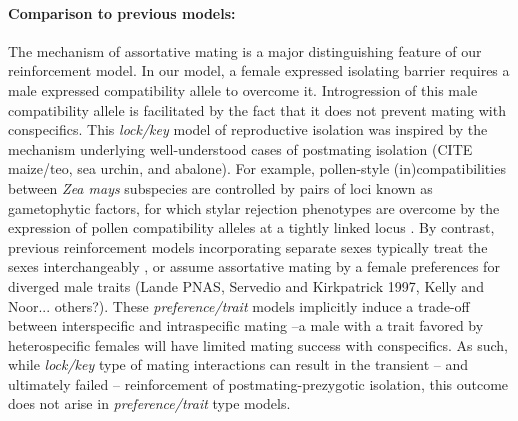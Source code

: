 \documentclass[11pt]{article}
\begin{document}
\paragraph{Comparison to previous models:}  
The mechanism of assortative mating is a major distinguishing feature of our reinforcement model. 
In our model, a female expressed isolating barrier requires a male expressed compatibility allele to overcome it.   %
Introgression of this male compatibility allele is facilitated by the fact that it does not prevent mating with conspecifics. 
This \textit{lock/key} model of reproductive isolation was inspired by the mechanism underlying well-understood cases of postmating isolation (CITE maize/teo, sea urchin, and abalone). 
For example, pollen-style (in)compatibilities between \textit{Zea mays} subspecies are controlled by pairs of loci known as gametophytic factors, for which stylar rejection phenotypes are overcome by the expression of pollen compatibility alleles at a tightly linked locus \cite{NELSON,1993}. 
By contrast, previous reinforcement models incorporating separate sexes typically treat the sexes interchangeably \citep[e.g. ][]{Felsenstein}, or assume assortative mating by a female preferences for diverged male traits (Lande PNAS, Servedio and Kirkpatrick 1997, Kelly and Noor... others?). 
These \textit{preference/trait} models implicitly induce a trade-off between interspecific and intraspecific mating --a male with a trait favored by heterospecific females will have limited mating success with conspecifics. 
As such, while \textit{lock/key} type of mating interactions can result in the transient -- and ultimately failed -- reinforcement of postmating-prezygotic isolation, this outcome does not arise in \textit{preference/trait}  type models.%
\end{document}
